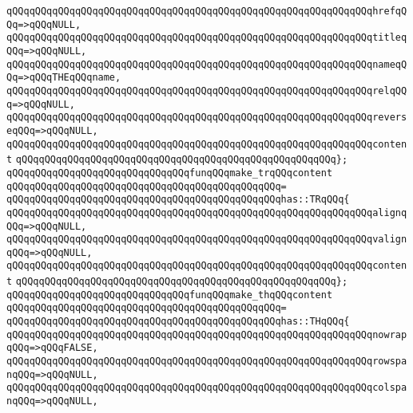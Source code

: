 \verb|qQQqqQQqqQQqqQQqqQQqqQQqqQQqqQQqqQQqqQQqqQQqqQQqqQQqqQQqqQQqqQQqhrefqQQq=>qQQqNULL,|\newline
\verb|qQQqqQQqqQQqqQQqqQQqqQQqqQQqqQQqqQQqqQQqqQQqqQQqqQQqqQQqqQQqqQQqtitleqQQq=>qQQqNULL,|\newline
\verb|qQQqqQQqqQQqqQQqqQQqqQQqqQQqqQQqqQQqqQQqqQQqqQQqqQQqqQQqqQQqqQQqnameqQQq=>qQQqTHEqQQqname,|\newline
\verb|qQQqqQQqqQQqqQQqqQQqqQQqqQQqqQQqqQQqqQQqqQQqqQQqqQQqqQQqqQQqqQQqrelqQQq=>qQQqNULL,|\newline
\verb|qQQqqQQqqQQqqQQqqQQqqQQqqQQqqQQqqQQqqQQqqQQqqQQqqQQqqQQqqQQqqQQqreverseqQQq=>qQQqNULL,|\newline
\verb|qQQqqQQqqQQqqQQqqQQqqQQqqQQqqQQqqQQqqQQqqQQqqQQqqQQqqQQqqQQqqQQqcontent|\newline
\verb|qQQqqQQqqQQqqQQqqQQqqQQqqQQqqQQqqQQqqQQqqQQqqQQqqQQqqQQq};|\newline
\newline
\verb|qQQqqQQqqQQqqQQqqQQqqQQqqQQqqQQqfunqQQqmake_trqQQqcontent|\newline
\verb|qQQqqQQqqQQqqQQqqQQqqQQqqQQqqQQqqQQqqQQqqQQqqQQq=|\newline
\verb|qQQqqQQqqQQqqQQqqQQqqQQqqQQqqQQqqQQqqQQqqQQqqQQqhas::TRqQQq{|\newline
\verb|qQQqqQQqqQQqqQQqqQQqqQQqqQQqqQQqqQQqqQQqqQQqqQQqqQQqqQQqqQQqqQQqalignqQQq=>qQQqNULL,|\newline
\verb|qQQqqQQqqQQqqQQqqQQqqQQqqQQqqQQqqQQqqQQqqQQqqQQqqQQqqQQqqQQqqQQqvalignqQQq=>qQQqNULL,|\newline
\verb|qQQqqQQqqQQqqQQqqQQqqQQqqQQqqQQqqQQqqQQqqQQqqQQqqQQqqQQqqQQqqQQqcontent|\newline
\verb|qQQqqQQqqQQqqQQqqQQqqQQqqQQqqQQqqQQqqQQqqQQqqQQqqQQqqQQq};|\newline
\newline
\verb|qQQqqQQqqQQqqQQqqQQqqQQqqQQqqQQqfunqQQqmake_thqQQqcontent|\newline
\verb|qQQqqQQqqQQqqQQqqQQqqQQqqQQqqQQqqQQqqQQqqQQqqQQq=|\newline
\verb|qQQqqQQqqQQqqQQqqQQqqQQqqQQqqQQqqQQqqQQqqQQqqQQqhas::THqQQq{|\newline
\verb|qQQqqQQqqQQqqQQqqQQqqQQqqQQqqQQqqQQqqQQqqQQqqQQqqQQqqQQqqQQqqQQqnowrapqQQq=>qQQqFALSE,|\newline
\verb|qQQqqQQqqQQqqQQqqQQqqQQqqQQqqQQqqQQqqQQqqQQqqQQqqQQqqQQqqQQqqQQqrowspanqQQq=>qQQqNULL,|\newline
\verb|qQQqqQQqqQQqqQQqqQQqqQQqqQQqqQQqqQQqqQQqqQQqqQQqqQQqqQQqqQQqqQQqcolspanqQQq=>qQQqNULL,|\newline
